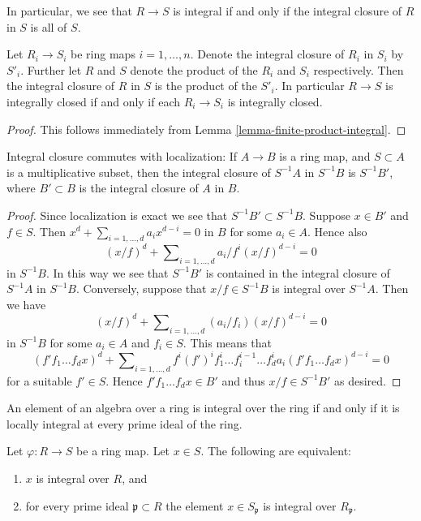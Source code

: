 \noindent
In particular, we see that $R \to S$ is integral if and only
if the integral closure of $R$ in $S$ is all of $S$.

\begin{lemma}
\label{lemma-finite-product-integral-closure}
Let $R_i\to S_i$ be ring maps $i = 1, \ldots, n$.
Denote the integral closure of $R_i$ in $S_i$ by $S'_i$.
Further let $R$ and $S$ denote the product of the $R_i$ and $S_i$ respectively.
Then the integral closure of $R$ in $S$
is the product of the $S'_i$. In particular $R \to S$ is
integrally closed if and only if each $R_i \to S_i$ is integrally closed.
\end{lemma}

\begin{proof}
This follows immediately from Lemma \ref{lemma-finite-product-integral}.
\end{proof}

\begin{lemma}
\label{lemma-integral-closure-localize}
Integral closure commutes with localization: If $A \to B$ is a ring
map, and $S \subset A$ is a multiplicative subset, then the integral
closure of $S^{-1}A$ in $S^{-1}B$ is $S^{-1}B'$, where $B' \subset B$
is the integral closure of $A$ in $B$.
\end{lemma}

\begin{proof}
Since localization is exact we see that $S^{-1}B' \subset S^{-1}B$.
Suppose $x \in B'$ and $f \in S$. Then
$x^d + \sum_{i = 1, \ldots, d} a_i x^{d - i} = 0$
in $B$ for some $a_i \in A$. Hence also
$$
(x/f)^d + \sum\nolimits_{i = 1, \ldots, d} a_i/f^i (x/f)^{d - i} = 0
$$
in $S^{-1}B$. In this way we see that $S^{-1}B'$ is contained in
the integral closure of $S^{-1}A$ in $S^{-1}B$. Conversely, suppose
that $x/f \in S^{-1}B$ is integral over $S^{-1}A$. Then we have
$$
(x/f)^d + \sum\nolimits_{i = 1, \ldots, d} (a_i/f_i) (x/f)^{d - i} = 0
$$
in $S^{-1}B$ for some $a_i \in A$ and $f_i \in S$. This means that
$$
(f'f_1 \ldots f_d x)^d +
\sum\nolimits_{i = 1, \ldots, d}
f^i(f')^if_1^i \ldots f_i^{i - 1} \ldots f_d^i a_i
(f'f_1 \ldots f_dx)^{d - i} = 0
$$
for a suitable $f' \in S$. Hence $f'f_1\ldots f_dx \in B'$ and thus
$x/f \in S^{-1}B'$ as desired.
\end{proof}

\begin{lemma}
\label{lemma-integral-closure-stalks}
\begin{slogan}
An element of an algebra over a ring is integral over the ring
if and only if it is locally integral at every prime ideal of the ring.
\end{slogan}
Let $\varphi : R \to S$ be a ring map.
Let $x \in S$. The following are equivalent:
\begin{enumerate}
\item $x$ is integral over $R$, and
\item for every prime ideal $\mathfrak p \subset R$ the element
$x \in S_{\mathfrak p}$ is integral over $R_{\mathfrak p}$.
\end{enumerate}
\end{lemma}

